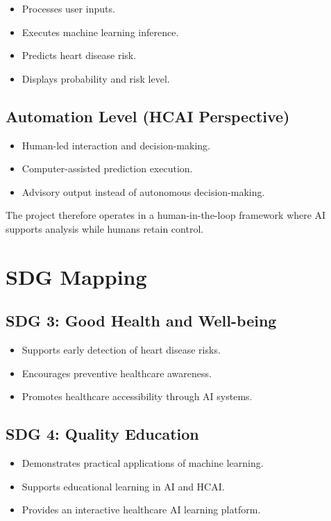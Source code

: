 \documentclass[12pt]{article}
\begin{document}
\begin{itemize}
    \item Processes user inputs.
    \item Executes machine learning inference.
    \item Predicts heart disease risk.
    \item Displays probability and risk level.
\end{itemize}

\subsection*{Automation Level (HCAI Perspective)}

\begin{itemize}
    \item Human-led interaction and decision-making.
    \item Computer-assisted prediction execution.
    \item Advisory output instead of autonomous decision-making.
\end{itemize}

The project therefore operates in a human-in-the-loop framework where AI supports analysis while humans retain control.

\section*{SDG Mapping}

\subsection*{SDG 3: Good Health and Well-being}

\begin{itemize}
    \item Supports early detection of heart disease risks.
    \item Encourages preventive healthcare awareness.
    \item Promotes healthcare accessibility through AI systems.
\end{itemize}

\subsection*{SDG 4: Quality Education}

\begin{itemize}
    \item Demonstrates practical applications of machine learning.
    \item Supports educational learning in AI and HCAI.
    \item Provides an interactive healthcare AI learning platform.
\end{itemize}
\end{document}
